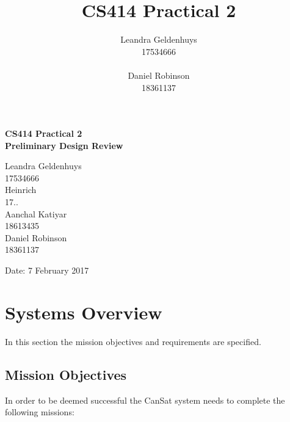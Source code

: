 \documentclass[10pt, a4paper]{article}
\title{CS414 Practical 2}
\author{Leandra Geldenhuys\\17534666\\\\Daniel Robinson\\18361137}
\begin{document}
    \begin{titlepage}
        \begin{center}
            \vspace*{1cm}
            
            \huge
            \textbf{CS414 Practical 2\\Preliminary Design Review}
            
            \vspace{1.5cm}
            
            \large
            Leandra Geldenhuys\\
            17534666\\
            \vspace{2.5cm}
            Heinrich\\
            17..\\
            \vspace{2.5cm}
            Aanchal Katiyar\\
            18613435\\
            \vspace{2.5cm}
            Daniel Robinson\\
            18361137\\
            \vspace{4.5cm}
            
            \large
            Date: 7 February 2017
            
        \end{center}
\end{titlepage}

\tableofcontents
\listoffigures
\listoftables

\newpage


\section{Systems Overview}

In this section the mission objectives and requirements are specified.

\subsection{Mission Objectives}
In order to be deemed successful the CanSat system needs to complete the following missions:
\end{document}
